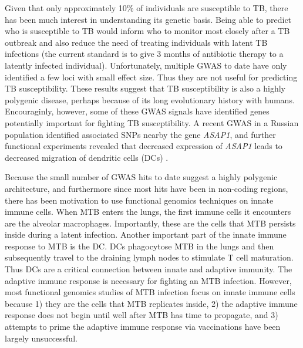 Given that only approximately 10\% of individuals are susceptible to
TB, there has been much interest in understanding its genetic
basis. Being able to predict who is susceptible to TB would inform who
to monitor most closely after a TB outbreak and also reduce the need
of treating individuals with latent TB infections (the current
standard is to give 3 months of antibiotic therapy to a latently
infected individual). Unfortunately, multiple GWAS to date have only
identified a few loci with small effect size. Thus they are not useful
for predicting TB susceptibility. These results suggest that TB
susceptibility is also a highly polygenic disease, perhaps because of
its long evolutionary history with humans. Encouraginly, however, some
of these GWAS signals have identified genes potentially important for
fighting TB susceptibility. A recent GWAS in a Russian population
identified associated SNPs nearby the gene \emph{ASAP1}, and further
functional experiments revealed that decreased expression of
\emph{ASAP1} leads to decreased migration of dendritic cells (DCs)
\citep{Curtis2015}.

Because the small number of GWAS hits to date suggest a highly
polygenic architecture, and furthermore since most hits have been in
non-coding regions, there has been motivation to use functional
genomics techniques on innate immune cells. When MTB enters the lungs,
the first immune cells it encounters are the alveolar
macrophages. Importantly, these are the cells that MTB persists inside
during a latent infection. Another important part of the innate immune
response to MTB is the DC. DCs phagocytose MTB in the lungs and then
subsequently travel to the draining lymph nodes to stimulate T cell
maturation. Thus DCs are a critical connection between innate and
adaptive immunity. The adaptive immune response is necessary for
fighting an MTB infection. However, most functional genomics studies
of MTB infection focus on innate immune cells because 1) they are the
cells that MTB replicates inside, 2) the adaptive immune response does
not begin until well after MTB has time to propagate, and 3) attempts
to prime the adaptive immune response via vaccinations have been
largely unsuccessful.

